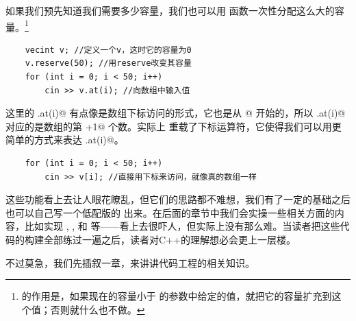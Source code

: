 如果我们预先知道我们需要多少容量，我们也可以用 \lstinline@reserve@ 函数一次性分配这么大的容量。\footnote{\lstinline@reserve@ 的作用是，如果现在的容量小于 \lstinline@reserve@ 的参数中给定的值，就把它的容量扩充到这个值；否则就什么也不做。}
\begin{lstlisting}
    vecint v; //定义一个v，这时它的容量为0
    v.reserve(50); //用reserve改变其容量
    for (int i = 0; i < 50; i++)
        cin >> v.at(i); //向数组中输入值
\end{lstlisting}\par
这里的 \lstinline@v.at(i)@ 有点像是数组下标访问的形式，它也是从 @ 开始的，所以 \lstinline@v.at(i)@ 对应的是数组的第 \lstinline@i+1@ 个数。实际上 \lstinline@vecint@ 重载了下标运算符，它使得我们可以用更简单的方式来表达 \lstinline@v.at(i)@。\par
\begin{lstlisting}
    for (int i = 0; i < 50; i++)
        cin >> v[i]; //直接用下标来访问，就像真的数组一样
\end{lstlisting}\par
这些功能看上去让人眼花瞭乱，但它们的思路都不难想，我们有了一定的基础之后也可以自己写一个低配版的 \lstinline@vecint@ 出来。在后面的章节中我们会实操一些相关方面的内容，比如实现 \lstinline@vector@, \lstinline@valarray@, \lstinline@string@ 和 \lstinline@stack@ 等——看上去很吓人，但实际上没有那么难。当读者把这些代码的构建全部练过一遍之后，读者对C++的理解想必会更上一层楼。\par
不过莫急，我们先插叙一章，来讲讲代码工程的相关知识。\par
